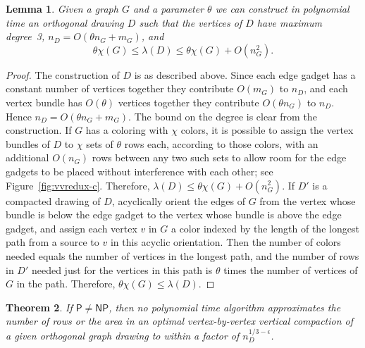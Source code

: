 \documentclass[12pt]{article}
\newtheorem{theorem}{Theorem}
\newtheorem{lemma}[theorem]{Lemma}
\theoremstyle{definitions}
\renewcommand{\P}{\mathsf{P}}
\newcommand{\NP}{\mathsf{NP}}
\begin{document}
\begin{lemma}
\label{unrestricted lemma}
Given a graph $G$ and a parameter $\theta$ we can construct in polynomial time an orthogonal drawing $D$ such that the vertices of $D$ have maximum degree~3, $n_D = O(\theta n_G + m_G)$, and
$$\theta \chi(G)\le \lambda(D) \le \theta \chi(G)+O(n_G^2).$$
\end{lemma}
\begin{proof}
The construction of $D$ is as described above. Since each edge gadget has a constant number of vertices together they contribute $O(m_G)$ to $n_D$, and each vertex bundle has $O(\theta)$ vertices together they contribute $O(\theta n_G)$ to $n_D$. Hence $n_D = O(\theta n_G + m_G)$. The bound on the degree is clear from the construction. If $G$ has a coloring with $\chi$ colors, it is possible to assign the vertex bundles of $D$ to $\chi$ sets of $\theta$ rows each, according to those colors, with an additional $O(n_G)$ rows between any two such sets to allow room for the edge gadgets to be placed without interference with each other; see Figure~\ref{fig:vvredux-c}. Therefore, $ \lambda(D)\le \theta \chi(G)+O(n_G^2)$.
If $D'$ is a compacted drawing of $D$, acyclically orient the edges of $G$ from the vertex whose bundle is below the edge gadget to the vertex whose bundle is above the edge gadget, and assign each vertex $v$ in $G$ a color indexed by the length of the longest path from a source to $v$ in this acyclic orientation. Then the number of colors needed equals the number of vertices in the longest path, and the number of rows in $D'$ needed just for the vertices in this path is $\theta$ times the number of vertices of $G$ in the path. Therefore, $\theta\chi(G) \le \lambda(D)$.
\end{proof}
\begin{theorem}
If $\P \neq \NP$, then no polynomial time algorithm approximates the number of
rows or the area in an optimal vertex-by-vertex vertical compaction of a given orthogonal graph drawing to within a factor of $n_D^{1/3 - \epsilon}$.
\end{theorem}
\end{document}
